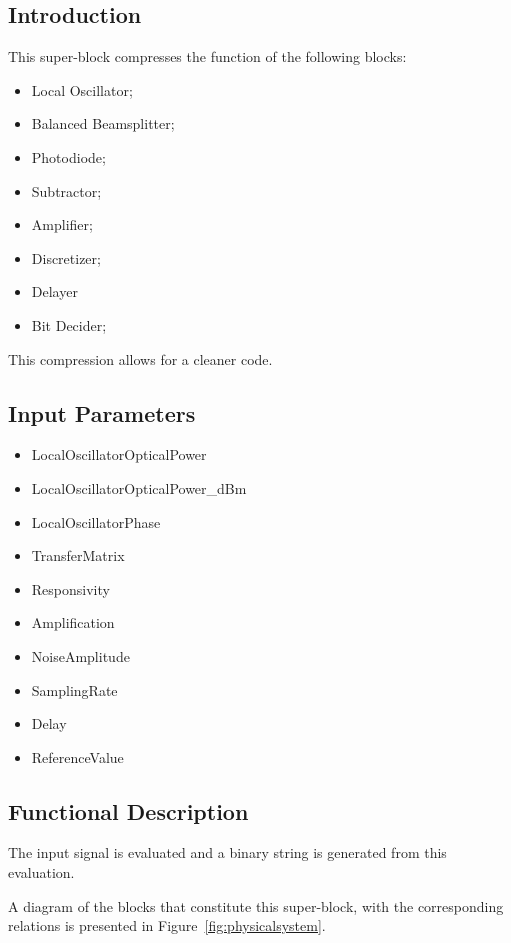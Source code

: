\documentclass[../../sdf/tex/BPSK_system.tex]{subfiles}
\date{}
\begin{document}
\onlyinsubfile{\maketitle}

\subsection*{Introduction}

This super-block compresses the function of the following blocks:
\begin{itemize}
\item Local Oscillator;
\item Balanced Beamsplitter;
\item Photodiode;
\item Subtractor;
\item Amplifier;
\item Discretizer;
\item Delayer
\item Bit Decider;
\end{itemize}
\noindent
This compression allows for a cleaner code. 

\subsection*{Input Parameters}

\begin{itemize}
	\item LocalOscillatorOpticalPower
	\item LocalOscillatorOpticalPower\_dBm
	\item LocalOscillatorPhase
	\item TransferMatrix
	\item Responsivity
	\item Amplification
	\item NoiseAmplitude
	\item SamplingRate
	\item Delay
	\item ReferenceValue
\end{itemize}

\subsection*{Functional Description}

The input signal is evaluated and a binary string is generated from this evaluation.
\par
A diagram of the blocks that constitute this super-block, with the corresponding relations is presented in Figure~\ref{fig:physicalsystem}.
\end{document}
